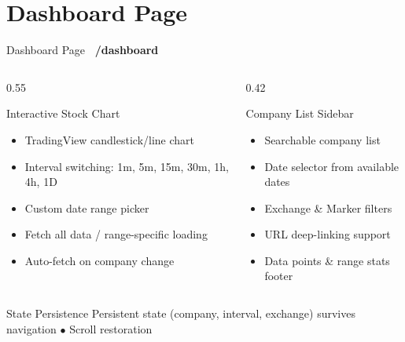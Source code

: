 \documentclass[aspectratio=169, 11pt]{beamer}
\newcommand{\tagbox}[2]{\colorbox{#1}{\scriptsize\color{white}\textbf{~#2~}}}
\begin{document}
\section{Dashboard Page}
\begin{frame}{Dashboard Page \hfill \tagbox{accentblue}{/dashboard}}
\begin{columns}[T]
\begin{column}{0.55\textwidth}
\begin{block}{Interactive Stock Chart}
\begin{itemize}
  \item TradingView candlestick/line chart
  \item Interval switching: 1m, 5m, 15m, 30m, 1h, 4h, 1D
  \item Custom date range picker
  \item Fetch all data / range-specific loading
  \item Auto-fetch on company change
\end{itemize}
\end{block}
\end{column}
\begin{column}{0.42\textwidth}
\begin{block}{Company List Sidebar}
\begin{itemize}
  \item Searchable company list
  \item Date selector from available dates
  \item Exchange \& Marker filters
  \item URL deep-linking support
  \item Data points \& range stats footer
\end{itemize}
\end{block}
\end{column}
\end{columns}
\vfill
\begin{exampleblock}{State Persistence}
Persistent state (company, interval, exchange) survives navigation $\bullet$ Scroll restoration
\end{exampleblock}
\end{frame}

\end{document}

